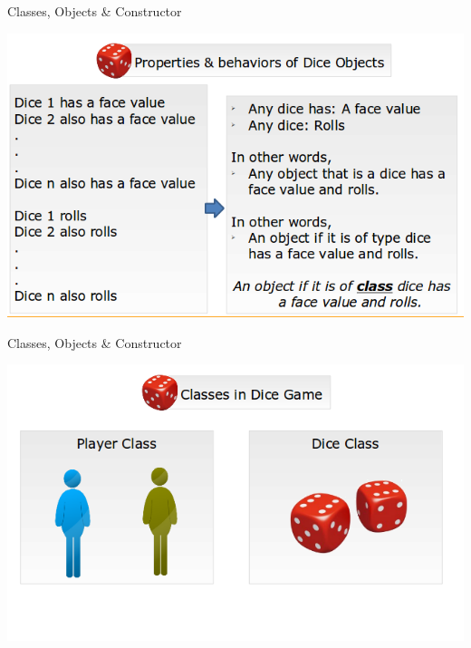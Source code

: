 \documentclass[14pt]{beamer}
\begin{document}
      \begin{frame}{Classes, Objects \& Constructor}
      \begin{center}
              \includegraphics[scale=0.5]{COJ-M01-S03-Image3.png}
                \end{center}
            \end{frame}
            \begin{frame}{Classes, Objects \& Constructor}
            \begin{center}
                    \includegraphics[scale=0.5]{COJ-M01-S03-Image4.png}
                      \end{center}
                  \end{frame}
\end{document}
